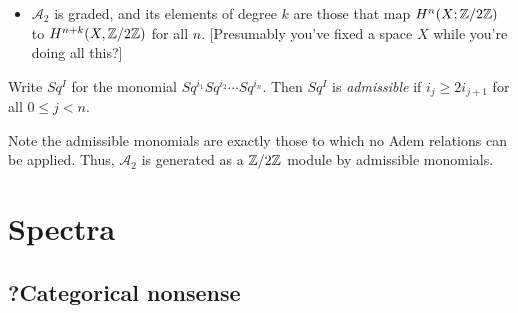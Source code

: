 \documentclass{MetricNotes2023}
\def\inte{\ensuremath\mathbb{Z}}
\def\A{\ensuremath{\mathscr{A}_2}}
\begin{document}
\begin{itemize}
\item \(\mathscr A_2\) is graded, and its elements of degree \(k\) are those that map \(H^n(X; \inte/2\inte)\) to \(H^{n+k}(X, \inte/2\inte)\) for all \(n\). [Presumably you've fixed a space \(X\) while you're doing all this?]
\end{itemize}

\begin{definition}
Write \(Sq^I\) for the monomial \(Sq^{i_1}Sq^{i_2}\cdots Sq^{i_n}\). Then \(Sq^I\) is \textit{admissible} if \(i_j\geq 2i_{j+1}\) for all \(0\leq j < n\). 
\end{definition}

Note the admissible monomials are exactly those to which no Adem relations can be applied. Thus, \(\A\) is generated as a \(\inte/2\inte\) module by admissible monomials. 

\autocite{hatcher}

\section{Spectra}

\subsection{?Categorical nonsense}
\end{document}
